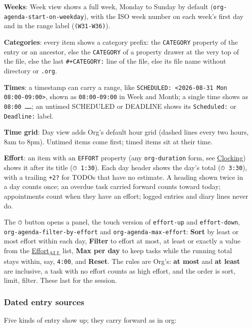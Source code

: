 \documentclass[11pt]{article}
\begin{document}
\textbf{Weeks}: Week view shows a full week, Monday to Sunday by default (\texttt{org-agenda-start-on-weekday}), with the ISO week number on each week's first day and in the range label (\texttt{(W31-W36)}).

\textbf{Categories}: every item shows a category prefix: the \texttt{CATEGORY} property of the entry or an ancestor, else the \texttt{CATEGORY} of a property drawer at the very top of the file, else the last \texttt{\#+CATEGORY:} line of the file, else its file name without directory or \texttt{.org}.

\textbf{Times}: a timestamp can carry a range, like \texttt{SCHEDULED: <2026-08-31 Mon 08:00-09:00>}, shown as \texttt{08:00-09:00} in Week and Month; a single time shows as \texttt{08:00 ……}; an untimed SCHEDULED or DEADLINE shows its \texttt{Scheduled:} or \texttt{Deadline:} label.

\textbf{Time grid}: Day view adds Org's default hour grid (dashed lines every two hours, 8am to 8pm). Untimed items come first; timed items sit at their time.

\textbf{Effort}: an item with an \texttt{EFFORT} property (any \texttt{org-duration} form, see \hyperref[sec:org6e1340d]{Clocking}) shows it after its title (\texttt{⏱ 1:30}). Each day header shows the day's total (\texttt{⏱ 3:30}), with a trailing \texttt{+2?} for TODOs that have no estimate. A heading shown twice in a day counts once; an overdue task carried forward counts toward today; appointments count when they have an effort; logged entries and diary lines never do.

The \texttt{⏱} button opens a panel, the touch version of \texttt{effort-up} and \texttt{effort-down}, \texttt{org-agenda-filter-by-effort} and \texttt{org-agenda-max-effort}: \textbf{Sort} by least or most effort within each day, \textbf{Filter} to effort at most, at least or exactly a value from the \hyperref[sec:orgb982436]{Effort\textsubscript{ALL}} list, \textbf{Max per day} to keep tasks while the running total stays within, say, \texttt{4:00}, and \textbf{Reset}. The rules are Org's: \textbf{at most} and \textbf{at least} are inclusive, a task with no effort counts as high effort, and the order is sort, limit, filter. These last for the session.

\subsubsection{Dated entry sources}
\label{sec:org2caca88}
Five kinds of entry show up; they carry forward as in org:
\end{document}
